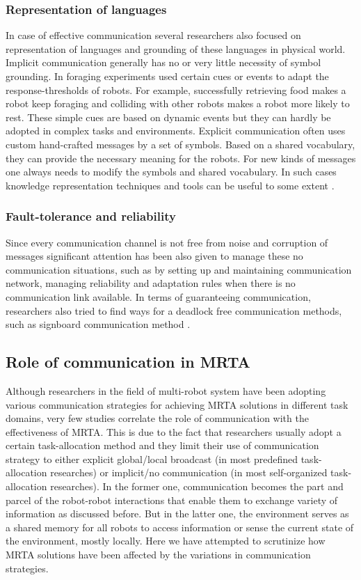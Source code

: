 \subsubsection*{Representation of languages}
In case of effective communication several researchers also focused on representation of languages and grounding of these languages in physical world. Implicit communication generally has no or very little necessity of symbol grounding. In foraging experiments  used certain cues or events to adapt the response-thresholds  of robots. For example, successfully retrieving food makes a robot keep foraging and colliding with other robots makes a robot more likely to rest. These simple cues are based on dynamic events but they can hardly be adopted in complex tasks and environments. Explicit communication often uses custom hand-crafted messages by a set of symbols. Based on a shared vocabulary, they can provide the necessary meaning for the robots. For new kinds of messages one always needs to modify the symbols and shared vocabulary. In such cases knowledge representation techniques and tools can be useful to some extent \cite{Parker2008}.
\subsubsection*{Fault-tolerance and reliability}
Since every communication channel is not free from noise and corruption of messages significant attention has been also given to manage these no communication situations, such as by setting up and maintaining communication network, managing reliability and adaptation rules when there is no communication link available. In terms of guaranteeing communication, researchers also tried to find ways for a deadlock free communication methods, such as signboard communication method \cite{Wang1989}.
\subsection{Role of communication in MRTA}
Although researchers in the field of multi-robot system have been adopting various communication strategies for achieving MRTA solutions in different task domains, very few studies correlate the role of communication with the effectiveness of MRTA. This is due to the fact that researchers usually adopt a certain task-allocation method and they limit their use of communication strategy to either explicit global/local broadcast (in most predefined task-allocation researches) or  implicit/no communication (in most self-organized task-allocation researches). In the former one, communication becomes the part and parcel of the robot-robot interactions that enable them to exchange variety of information as discussed before. But in the latter one, the environment serves as a shared memory for all robots to access information or sense the current state of the environment, mostly locally. Here we have attempted to scrutinize how MRTA solutions have been affected by the variations in communication strategies.

